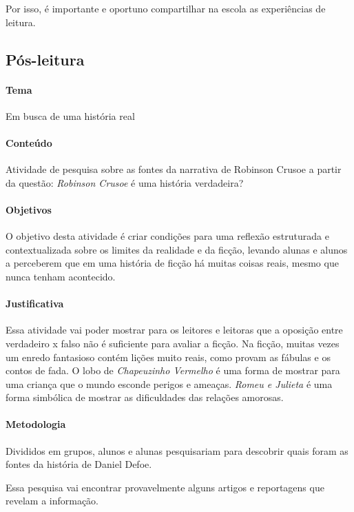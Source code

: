\documentclass{article}
\begin{document}
Por isso, é importante e oportuno compartilhar na escola as experiências
de leitura.

\subsection{Pós-leitura}

\paragraph{Tema} Em busca de uma história real


\paragraph{Conteúdo} Atividade de pesquisa sobre as fontes da narrativa de Robinson Crusoe a partir da questão: \emph{Robinson Crusoe} é uma história verdadeira?

\paragraph{Objetivos}
O objetivo desta atividade é criar condições para uma reflexão
estruturada e contextualizada sobre os limites da realidade e da ficção,
levando alunas e alunos a perceberem que em uma história de ficção há
muitas coisas reais, mesmo que nunca tenham acontecido.

\paragraph{Justificativa}
Essa atividade vai poder mostrar para os leitores e leitoras que a
oposição entre verdadeiro x falso não é suficiente para avaliar a
ficção. Na ficção, muitas vezes um enredo fantasioso contém lições muito
reais, como provam as fábulas e os contos de fada. O lobo de
\emph{Chapeuzinho Vermelho} é uma forma de mostrar para uma criança que
o mundo esconde perigos e ameaças. \emph{Romeu e Julieta} é uma forma
simbólica de mostrar as dificuldades das relações amorosas.

\paragraph{Metodologia}
Divididos em grupos, alunos e alunas pesquisariam para descobrir quais
foram as fontes da história de Daniel Defoe.

Essa pesquisa vai encontrar provavelmente alguns artigos e reportagens
que revelam a informação.
\end{document}
